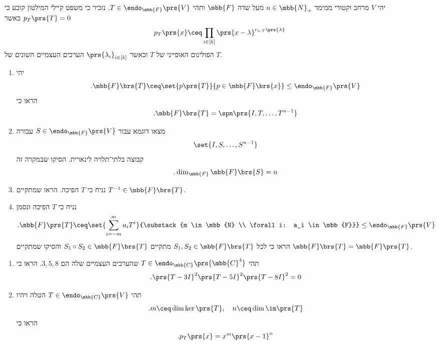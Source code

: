 \documentclass[a4paper,10pt,twoside,openany]{article}
\begin{document}
\begin{exercise}%
יהי
$V$
מרחב וקטורי ממימד
$n \in \mbb{N}_+$
מעל שדה
$\mbb{F}$
ותהי
$T \in \endo_{\mbb{F}}\prs{V}$.
נזכיר כי משפט קיילי המילטון קובע כי
$p_T\prs{T} = 0$
כאשר
\[p_T\prs{x} \ceq \prod_{i \in [k]} \prs{x-\lambda}^{r_{a,T}\prs{\lambda}}\]
הפולינום האופייני של
$T$
וכאשר
$\prs{\lambda_i}_{i \in [k]}$
הערכים העצמיים השונים של
$T$.

\begin{enumerate}
\item
יהי
\[\text{.} \mbb{F}\brs{T} \ceq \set{p\prs{T}}{p \in \mbb{F}\brs{x}} \leq \endo_{\mbb{F}}\prs{V}\]
 הראו כי
\[\text{.} \mbb{F}\brs{T} = \spn\prs{I, T, \ldots, T^{n-1}}\]

\item
מצאו דוגמא עבור
$S \in \endo_{\mbb{F}}\prs{V}$
עבורה
\[\set{I, S, \ldots, S^{n-1}}\]
קבוצה בלתי־תלויה לינארית. הסיקו שבמקרה זה
\[\text{.} \dim_{\mbb{F}} \mbb{F}\brs{S} = n\]

\item
נניח כי
$T$
הפיכה. הראו שמתקיים
$T^{-1} \in \mbb{F}\brs{T}$.

\item נניח כי
$T$
הפיכה ונסמן
\[\text{.} \mbb{F}\prs{T} \ceq \set{\sum_{i=-m}^m a_i T^i}{\substack{m \in \mbb{N} \\ \forall i: a_i \in \mbb{F}}} \leq \endo_{\mbb{F}}\prs{V}\]
הראו כי לכל
$S_1, S_2 \in \mbb{F}\brs{T}$
מתקיים
$S_1 \circ S_2 \in \mbb{F}\brs{T}$
והסיקו שמתקיים
$\mbb{F}\brs{T} = \mbb{F}\prs{T}$.
\end{enumerate}
\end{exercise}

\begin{exercise}
\begin{enumerate}
\item תהי
$T \in \endo_{\mbb{C}}\prs{\mbb{C}^4}$
שהערכים העצמיים שלה הם
$3,5,8$.
הראו כי
\[\text{.} \prs{T - 3I}^2\prs{T - 5I}^2 \prs{T - 8I}^2 = 0\]
\item תהי
$T \in \endo_{\mbb{C}}\prs{V}$
הטלה ויהיו
\[\text{.} m \ceq \dim \ker \prs{T}, \quad n \ceq \dim \im \prs{T}\]
הראו כי
\[\text{.} p_T\prs{x} = x^m \prs{x-1}^n\]
\end{enumerate}
\end{exercise}
\end{document}
